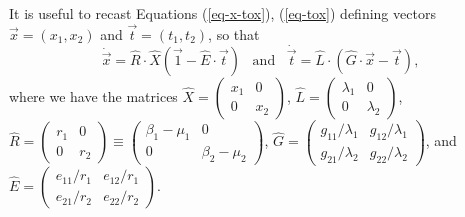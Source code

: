It is useful to recast Equations (\ref{eq-x-tox}), (\ref{eq-tox}) defining vectors $\vec{x}=(x_1,x_2)$ and $\vec{t}=(t_1,t_2)$, so that
\begin{equation}
\dot{\vec{x}} = \hat{R}\cdot\hat{X} \left( \vec{1} - \hat{E}\cdot \vec{t} \right)\;\;\;\text{and}\;\;\;
\dot{\vec{t}} = \hat{L}\cdot  \left( \hat{G}\cdot \vec{x} - \vec{t} \right), \label{xdot-tdot-eqn}
\end{equation}
where we have the matrices $\hat{X} = \begin{pmatrix}
x_1 & 0 \\
0 & x_2
\end{pmatrix}$, $\hat{L} = \begin{pmatrix}
\lambda_1 & 0 \\
0 & \lambda_2
\end{pmatrix}$, $\hat{R} = \begin{pmatrix}
r_1 & 0 \\
0 & r_2
\end{pmatrix} \equiv \begin{pmatrix}
\beta_1-\mu_1 & 0 \\
0 & \beta_2-\mu_2
\end{pmatrix}$, $\hat{G} = \begin{pmatrix}
g_{11}/\lambda_1 & g_{12}/\lambda_1 \\
g_{21}/\lambda_2 & g_{22}/\lambda_2
\end{pmatrix}$, and $\hat{E} = \begin{pmatrix}
e_{11}/r_1 & e_{12}/r_1 \\
e_{21}/r_2 & e_{22}/r_2
\end{pmatrix}$.


